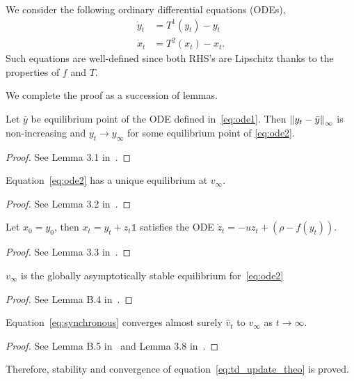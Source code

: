 We consider the following ordinary differential equations (ODEs),
\begin{align}
    \dot{y}_t &= T^1(y_t) - y_t \label{eq:ode1} \\
    \dot{x}_t &= T^2(x_t) - x_t \label{eq:ode2}.
\end{align}
Such equations are well-defined since both RHS's are Lipschitz thanks to the properties of $f$ and $T$.

\noindent We complete the proof as a succession of lemmas.

\begin{lemma}
    Let $\bar{y}$ be equilibrium point of the ODE defined in~\eqref{eq:ode1}. Then $\left\|y_t - \bar{y}\right\|_\infty$ is non-increasing and $y_t\rightarrow y_\infty$ for some equilibrium point of \eqref{eq:ode2}.
\end{lemma}

\begin{proof}
    See Lemma 3.1 in~\cite{Abounadi2001}.
\end{proof} 

\begin{lemma}
    Equation~\eqref{eq:ode2} has a unique equilibrium at $v_\infty$.
\end{lemma}

\begin{proof}
    See Lemma 3.2 in~\cite{Abounadi2001}.
\end{proof}

\begin{lemma}
    Let $x_0=y_0$, then $x_t = y_t + z_t\mathds{1}$ satisfies the ODE $\dot{z}_t = -u z_t + (\rho - f(y_t))$.
\end{lemma}
\begin{proof}
    See Lemma 3.3 in~\cite{Abounadi2001}.
\end{proof} 

\begin{lemma}
    $v_\infty$ is the globally asymptotically stable equilibrium for~\eqref{eq:ode2}
\end{lemma}
\begin{proof}
    See Lemma B.4 in~\cite{Wan2021}.
\end{proof}  

\begin{lemma}
    Equation~\eqref{eq:synchronous} converges almost surely $\hat v_t$ to $v_\infty$ as $t\rightarrow\infty$.
\end{lemma} 
\begin{proof}
    See Lemma B.5 in~\cite{Wan2021} and Lemma 3.8 in~\cite{Abounadi2001}.
\end{proof}

Therefore, stability and convergence of equation~\eqref{eq:td_update_theo} is proved.